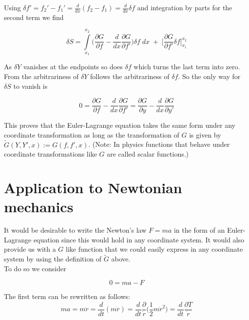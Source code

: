 \documentclass{article}
\begin{document}
Using $\delta f' = f_2' - f_1' = \frac{d}{dx}(f_2 - f_1) = \frac{d}{dx} \delta f$ and integration by parts for the second term we find


\begin{equation}
\delta S = \int\limits_{x_1}^{x_2} \bigg( \frac{\partial G}{\partial f} 
- \frac{d}{dx} \frac{\partial G}{\partial f'} \bigg) \delta f \; dx \;
+ \; \bigg[\frac{\partial G}{\partial f'} \delta f \bigg]_{x_1}^{x_2}
\end{equation}


As $\delta Y$ vanishes at the endpoints so does $\delta f$ which turns the last term into zero. From the arbitrariness of $\delta Y$ follows the arbitrariness of $\delta f$. So the only way for $\delta S$ to vanish is

\begin{equation}
0 = \frac{\partial G}{\partial f} - \frac{d}{dx} \frac{\partial G}{\partial f'} 
= \frac{\partial G}{\partial y} - \frac{d}{dx} \frac{\partial G}{\partial y'} 
\end{equation}

This proves that the Euler-Lagrange equation takes the same form under any coordinate transformation as long as the transformation of $G$ is given by $\widetilde{G}(Y,Y',x) := G(f,f',x)$. (Note: In physics functions that behave under coordinate transformations like $G$ are called scalar functions.)

\section{Application to Newtonian mechanics \cite{Guthrie}}


It would be desirable to write the Newton's law $F=ma$ in the form of an Euler-Lagrange equation since this would hold in any coordinate system. It would also provide us with a $G$ like function that we could easily express in any coordinate system by using the definition of $\widetilde{G}$ above.\\

To do so we consider

\begin{equation}
0 = ma - F
\end{equation}

The first term can be rewritten as follows:
\begin{equation}
ma = m \ddot{r} = \frac{d}{dt} (m \dot{r}) 
= \frac{d}{dt} \frac{\partial}{\dot{r}} \Big(\frac{1}{2} m \dot{r}^2 \Big) 
= \frac{d}{dt} \frac{\partial T}{\dot{r}}
\end{equation}
\end{document}
